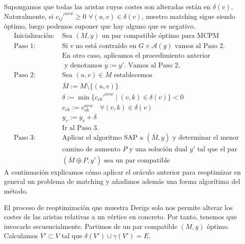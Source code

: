 \documentclass[twoside,a4paper,openright,12pt,tikz]{book}
\begin{document}
Supongamos que todas las aristas cuyos costes son alteradas están en $\delta(v)$. Naturalmente, si $c_{ij}'^{new} \geq 0$ $\forall (u,v) \in \delta(v)$, nuestro matching sigue siendo óptimo, luego podemos suponer que hay alguno que es negativo.
\begin{align*}
\text{Inicialización: }& \text{Sea $(M,y)$ un par compatible óptimo para MCPM}\\
\text{Paso 1: }& \text{Si $v$ no está contraído en $G\times \mathcal{A}(y)$ vamos al Paso 2.}\\
&\text{En otro caso, aplicamos el procedimiento anterior}\\
&\text{ y denotamos $y:=y'$. Vamos al Paso 2.}\\
\text{Paso 2: }& \text{Sea $(u,v) \in M$ establecemos}\\
&\overline{M}:=M\setminus\{(u,v)\}\\
&\delta:=\min\{c_{vk}'^{new}\mid (v,k)\in \delta(v)\}<0\\
&c_{vk}:=c_{vk}^{new} \quad \forall (v,k)\in \delta (v)\\
&y_v:=y_v+\delta\\
&\text{Ir al Paso 3.}\\
\text{Paso 3: }&\text{Aplicar el algoritmo SAP a $(\overline{M},y)$ y determinar el menor}\\
&\text{camino de aumento $P$ y una solución dual $y'$ tal que el par}\\
&\text{$(\overline{M}\oplus P,y')$ sea un par compatible}
\end{align*}
A continuación explicamos cómo aplicar el oráculo anterior para reoptimizar en general un problema de matching y añadimos además una forma algorítima del método.

El proceso de reoptimización que muestra Derigs solo nos permite alterar los costes de las aristas relativas a un vértice en concreto. Por tanto, tenemos que invocarlo secuencialmente. Partimos de un par compatible $(M,y)$ óptimo. Calculamos $V' \subset V$ tal que $\delta(V') \cup \gamma(V')= E$. 	
\end{document}
